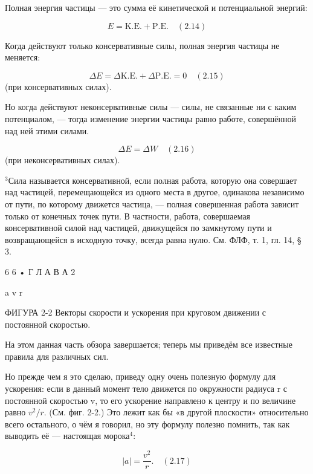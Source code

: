 \documentclass[10pt,oneside]{article}
\begin{document}
Полная энергия частицы --- это сумма её кинетической и потенциальной энергий:\par

\[E = \text{K.E.} + \text{P.E.}  \quad(2.14)\]

Когда действуют только консервативные силы, полная энергия частицы не меняется:\par

\[\Delta E = \Delta \text{K.E.} + \Delta \text{P.E.} = 0 \quad(2.15)\] (при консервативных силах).\par

Но когда действуют неконсервативные силы --- силы, не связанные ни с каким потенциалом, --- тогда изменение энергии частицы равно работе, совершённой над ней этими силами.\par

\[\Delta E = \Delta W \quad(2.16)\] (при неконсервативных силах).\par

\(^3\)Сила называется консервативной, если полная работа, которую она совершает над частицей, перемещающейся из одного места в другое, одинакова независимо от пути, по которому движется частица, --- полная совершенная работа зависит только от конечных точек пути. В частности, работа, совершаемая консервативной силой над частицей, движущейся по замкнутому пути и возвращающейся в исходную точку, всегда равна нулю. См. ФЛФ, т. 1, гл. 14, § 3.\par

6 6 • Г Л А В А  2\par

a v r\par

ФИГУРА 2-2 Векторы скорости и ускорения при круговом движении с постоянной скоростью.\par

На этом данная часть обзора завершается; теперь мы приведём все известные правила для различных сил.\par

Но прежде чем я это сделаю, приведу одну очень полезную формулу для ускорения: если в данный момент тело движется по окружности радиуса r с постоянной скоростью v, то его ускорение направлено к центру и по величине равно \(v^2/r\). (См. фиг. 2-2.) Это лежит как бы «в другой плоскости» относительно всего остального, о чём я говорил, но эту формулу полезно помнить, так как выводить её --- настоящая морока\(^4\):\par

\[|a| = \frac{v^2}{r}. \quad(2.17)\]
\end{document}
